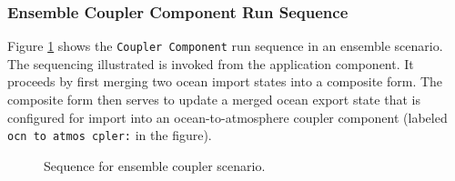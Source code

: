 \subsubsection{Ensemble Coupler Component Run Sequence}
Figure \ref{fig:EnsembleComponentsCouplerRunSequence} shows the
{\tt Coupler Component} run sequence in an ensemble scenario. The sequencing
illustrated is invoked from the application component. It proceeds by
first merging two ocean import states into a composite form. The composite
form then serves to update a merged ocean export state that is
configured for import into an ocean-to-atmosphere coupler component 
(labeled {\tt ocn to atmos cpler:} in the figure).
\begin{figure}
\caption[{Ensemble Coupler Run}]{Sequence for ensemble coupler
scenario.\\}
\begin{center}
\label{fig:EnsembleComponentsCouplerRunSequence}
\end{center}
\end{figure}

